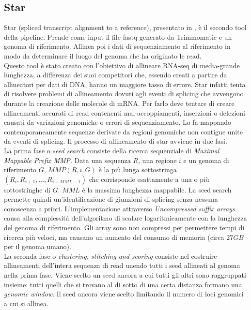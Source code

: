 	\subsection{Star}
	\label{subsec:star}
	Star (spliced transcript alignment to a reference), presentato in \cite{star}, \`e il secondo tool della pipeline.
	Prende come input il file fastq generato da Trimmomatic e un genoma di riferimento.
        Allinea poi i dati di sequenziamento al riferimento in modo da determinare il luogo del genoma che ha originato le read.\\
	Questo tool \`e stato creato con l'obiettivo di allineare RNA-seq di media-grande lunghezza, a differenza dei suoi competitori che, essendo creati a partire da allineatori per dati di DNA, hanno un maggiore tasso di errore.
        Star infatti tenta di risolvere problemi di allineamento dovuti agli eventi di splicing che avvengono durante la creazione delle molecole di mRNA.
        Per farlo deve tentare di creare allineamenti accurati di read contenenti mal-accoppiamenti, inserzioni o delezioni causati da variazioni genomiche o errori di sequenziamento.
        Lo fa mappando contemporaneamente sequenze derivate da regioni genomiche non contigue unite da eventi di splicing.
        Il processo di allineamento di star avviene in due fasi.\\
	La prima fase o \emph{seed search} consiste della ricerca sequenziale di \emph{Maximal Mappable Prefix MMP}.
	Data una sequenza $R$, una regione $i$ e un genoma di riferimento $G$, $MMP(R, i, G)$ \`e la pi\`u lunga sottostringa $(R_i, R_{i+1}, \dots, R_{i+MML-1})$ che corrisponde esattamente a una o pi\`u sottostringhe di $G$.
	$MML$ \`e la massima lunghezza mappabile.
	La seed search permette quindi un'identificazione di giunzioni di splicing senza nessuna conoscenza a priori.
	L'implementazione attraverso \emph{Uncompressed suffix arrays} causa alla complessit\`a dell'algoritmo di scalare logaritmicamente con la lunghezza del genoma di riferimento.
	Gli array sono non compressi per permettere tempi di ricerca pi\`u veloci, ma causano un aumento del consumo di memoria (circa $27GB$ per il genoma umano).\\
	La seconda fase o \emph{clustering, stitching and scoring} consiste nel costruire allineamenti dell'intera sequenza di read unendo tutti i seed allineati al genoma nella prima fase.
        Viene scelto un seed ancora a cui tutti gli altri sono raggruppati insieme: tutti quelli che si trovano al di sotto di una certa distanza formano una \emph{genomic window}.
        Il seed ancora viene scelto limitando il numero di loci genomici a cui si allinea.
